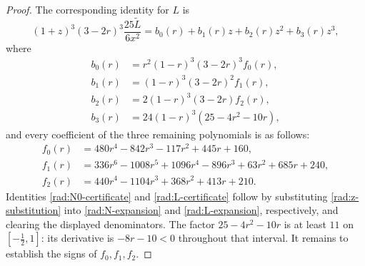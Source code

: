 \begin{proof}
The corresponding identity for $L$ is
\begin{equation}\label{rad:L-certificate}
 (1+z)^3(3-2r)^3\frac{25\widetilde L}{6x^2}
 =b_0(r)+b_1(r)z+b_2(r)z^2+b_3(r)z^3,
\end{equation}
where
\begin{align*}
 b_0(r)&=r^2(1-r)^3(3-2r)^3 f_0(r),\\
 b_1(r)&=(1-r)^3(3-2r)^2 f_1(r),\\
 b_2(r)&=2(1-r)^3(3-2r) f_2(r),\\
 b_3(r)&=24(1-r)^3(25-4r^2-10r),
\end{align*}
and every coefficient of the three remaining polynomials is as follows:
\begin{equation}\label{rad:f-polynomials}
\begin{aligned}
 f_0(r)&=480r^4-842r^3-117r^2+445r+160,\\
 f_1(r)&=336r^6-1008r^5+1096r^4-896r^3
                  +63r^2+685r+240,\\
 f_2(r)&=440r^4-1104r^3+368r^2+413r+210.
\end{aligned}
\end{equation}
Identities \eqref{rad:N0-certificate} and \eqref{rad:L-certificate}
follow by substituting \eqref{rad:z-substitution} into
\eqref{rad:N-expansion} and \eqref{rad:L-expansion}, respectively,
and clearing the displayed denominators.
The factor $25-4r^2-10r$ is at least $11$ on
$[-\frac12,1]$: its derivative is $-8r-10<0$ throughout that interval.
It remains to establish the signs of $f_0,f_1,f_2$.


\end{proof}
